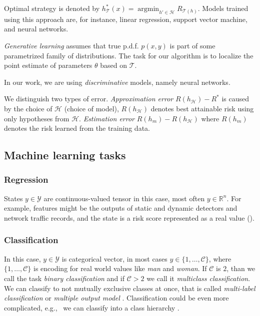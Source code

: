Optimal strategy is denoted by $h_{\mathcal{T}}^*(x)=\operatorname*{argmin}_{{h}'\in \mathcal{H}}R_{\mathcal{T}(h)}$. Models trained using this approach are, for instance, linear regression, support vector machine, and neural networks.

\emph{Generative learning} assumes that true p.d.f. $p(x,y)$ is part of some parametrized family of distributions. The task for our algorithm is to localize the point estimate of parameters $\theta$ based on $\mathcal{T}$.

In our work, we are using \emph{discriminative} models, namely neural networks.


We distinguish two types of error. \emph{Approximation error} $R(h_{\mathcal{H}})-R^*$  is caused by the choice of $\mathcal{H}$ (choice of model), $R(h_{\mathcal{H}})$ denotes best attainable risk using only hypotheses from $\mathcal{H}$. \emph{Estimation error} $R(h_{m})-R(h_{\mathcal{H}})$ where $R(h_{m})$ denotes the risk learned from the training data.


\subsection{Machine learning tasks}
\subsubsection*{Regression}
States $y \in \mathcal{Y}$ are continuous-valued tensor in this case, most often $y \in \mathbb{R}^{n}$. For example, features might be the outputs of static and dynamic detectors and network traffic records, and the state is a risk score represented as a real value (\cite{Jaganathan2015}).

\subsubsection*{Classification}
In this case, $y \in \mathcal{Y}$ is categorical vector, in most cases $y \in \{1,\dots,\mathcal{C}\}$, where $\{1,\dots,\mathcal{C}\}$ is encoding for real world values like \emph{man} and \emph{woman}. If $\mathcal{C}$ is $2$, than we call the task \emph{binary classification} and if $\mathcal{C}>2$ we call it \emph{multiclass classification}. We can classify to not mutually exclusive classes at once, that is called \emph{multi-label classification} or \emph{multiple output model} \cite{murphy2013machine}. Classification could be even more complicated, e.g., \ we can classify into a class hierarchy \cite{zhang2020dive}.

